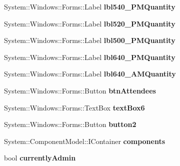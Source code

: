 \begin{DoxyCompactItemize}
\mbox{\label{class_project1_1_1_my_form_a043d735a4361dae714e65326304f8fdd}} 
System\+::\+Windows\+::\+Forms\+::\+Label {\bfseries lbl540\+\_\+P\+M\+Quantity}
\item 
\mbox{\label{class_project1_1_1_my_form_a6f726ea945292b6fd1cdf8a193f2caea}} 
System\+::\+Windows\+::\+Forms\+::\+Label {\bfseries lbl520\+\_\+P\+M\+Quantity}
\item 
\mbox{\label{class_project1_1_1_my_form_ab779082cff79a9ff47a8816e2e18a632}} 
System\+::\+Windows\+::\+Forms\+::\+Label {\bfseries lbl500\+\_\+P\+M\+Quantity}
\item 
\mbox{\label{class_project1_1_1_my_form_ab8d59941d274b1c4efb1ee1b49ae8266}} 
System\+::\+Windows\+::\+Forms\+::\+Label {\bfseries lbl640\+\_\+P\+M\+Quantity}
\item 
\mbox{\label{class_project1_1_1_my_form_a8258d6c32b4ca2d9ddec536bee8e04ee}} 
System\+::\+Windows\+::\+Forms\+::\+Label {\bfseries lbl640\+\_\+A\+M\+Quantity}
\item 
\mbox{\label{class_project1_1_1_my_form_a103f434b89029521d68875586de62b95}} 
System\+::\+Windows\+::\+Forms\+::\+Button {\bfseries btn\+Attendees}
\item 
\mbox{\label{class_project1_1_1_my_form_aabc0d43e45df081c8ef48acf61834dae}} 
System\+::\+Windows\+::\+Forms\+::\+Text\+Box {\bfseries text\+Box6}
\item 
\mbox{\label{class_project1_1_1_my_form_acf8cc799ee058e8e28589feaeed403f5}} 
System\+::\+Windows\+::\+Forms\+::\+Button {\bfseries button2}
\item 
\mbox{\label{class_project1_1_1_my_form_a920da4f01c905d9e8b6e3648df58801d}} 
System\+::\+Component\+Model\+::\+I\+Container {\bfseries components}
\item 
\mbox{\label{class_project1_1_1_my_form_a8232993e20bc1e170d988a4ef69035eb}} 
bool {\bfseries currently\+Admin}
\end{DoxyCompactItemize}


